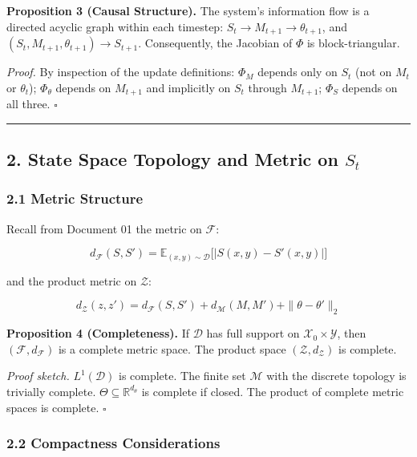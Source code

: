 \documentclass[
  12pt,
]{ctexart}
\begin{document}
\textbf{Proposition 3 (Causal Structure).} The system's information flow
is a directed acyclic graph within each timestep:
\(S_t \to M_{t+1} \to \theta_{t+1}\), and
\((S_t, M_{t+1}, \theta_{t+1}) \to S_{t+1}\). Consequently, the Jacobian
of \(\Phi\) is block-triangular.

\emph{Proof.} By inspection of the update definitions: \(\Phi_M\)
depends only on \(S_t\) (not on \(M_t\) or \(\theta_t\));
\(\Phi_\theta\) depends on \(M_{t+1}\) and implicitly on \(S_t\) through
\(M_{t+1}\); \(\Phi_S\) depends on all three. \(\square\)

\begin{center}\rule{0.5\linewidth}{0.5pt}\end{center}

\subsection{\texorpdfstring{2. State Space Topology and Metric on
\(S_t\)}{2. State Space Topology and Metric on S\_t}}\label{state-space-topology-and-metric-on-s_t}

\subsubsection{2.1 Metric Structure}\label{metric-structure}

Recall from Document 01 the metric on \(\mathcal{F}\):

\[d_{\mathcal{F}}(S, S') = \mathbb{E}_{(x,y) \sim \mathcal{D}}\bigl[ |S(x,y) - S'(x,y)| \bigr]\]

and the product metric on \(\mathcal{Z}\):

\[d_{\mathcal{Z}}(z, z') = d_{\mathcal{F}}(S, S') + d_{\mathcal{M}}(M, M') + \|\theta - \theta'\|_2\]

\textbf{Proposition 4 (Completeness).} If \(\mathcal{D}\) has full
support on \(\mathcal{X}_0 \times \mathcal{Y}\), then
\((\mathcal{F}, d_{\mathcal{F}})\) is a complete metric space. The
product space \((\mathcal{Z}, d_{\mathcal{Z}})\) is complete.

\emph{Proof sketch.} \(L^1(\mathcal{D})\) is complete. The finite set
\(\mathcal{M}\) with the discrete topology is trivially complete.
\(\Theta \subseteq \mathbb{R}^{d_\theta}\) is complete if closed. The
product of complete metric spaces is complete. \(\square\)

\subsubsection{2.2 Compactness
Considerations}\label{compactness-considerations}
\end{document}
